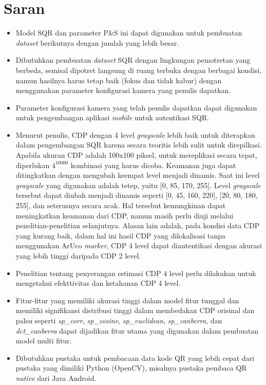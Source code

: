 \section{Saran}
\begin{itemize}
    \item Model SQR dan parameter P\&S ini dapat digunakan untuk pembuatan \emph{dataset} berikutnya dengan jumlah yang lebih besar.
    \item Dibutuhkan pembuatan \emph{dataset} SQR dengan lingkungan pemotretan yang berbeda, semisal dipotret langsung di ruang terbuka dengan berbagai kondisi, namun
          hasilnya harus tetap baik (fokus dan tidak kabur) dengan menggunakan parameter konfigurasi kamera yang penulis dapatkan.
    \item Parameter konfigurasi kamera yang telah penulis dapatkan dapat digunakan untuk pengembangan aplikasi \emph{mobile} untuk autentikasi SQR.
    \item Menurut penulis, CDP dengan 4 level \emph{grayscale} lebih baik untuk diterapkan dalam pengembangan SQR karena secara teoritis lebih sulit untuk direpilkasi.
          Apabila ukuran CDP adalah 100x100 piksel, untuk mereplikasi secara tepat, diperlukan $4^{10000}$ kombinasi yang harus dicoba. Keamanan juga dapat ditingkatkan
          dengan mengubah keempat level menjadi dinamis. Saat ini level \emph{grayscale} yang digunakan adalah tetep, yaitu [0, 85, 170, 255]. Level \emph{grayscale}
          tersebut dapat diubah menjadi dinamis seperti [0, 45, 160, 220], [20, 80, 180, 255], dan seterusnya secara acak. Hal tersebut kemungkinan dapat meningkatkan
          keamanan dari CDP, namun masih perlu diuji melalui penelitian-penelitian selanjutnya. Alasan lain adalah, pada kondisi data CDP yang kurang baik, dalam hal ini
          hasil CDP yang dilokalisasi tanpa menggunakan ArUco \emph{marker}, CDP 4 level dapat diautentikasi dengan akurasi yang lebih tinggi daripada CDP 2 level.
    \item Penelitian tentang penyerangan estimasi CDP 4 level perlu dilakukan untuk mengetahui efekttivitas dan ketahanan CDP 4 level.
    \item Fitur-fitur yang memiliki akurasi tinggi dalam model fitur tunggal dan memiliki signifikansi distribusi tinggi dalam membedakan CDP orisinal dan palsu seperti
          \emph{sp\_corr}, \emph{sp\_cosine}, \emph{sp\_euclidean}, \emph{sp\_canberra}, dan \emph{dct\_canberra} dapat dijadikan fitur utama yang digunakan dalam
          pembuatan model multi fitur.
    \item Dibutuhkan pustaka untuk pembacaan data kode QR yang lebih cepat dari pustaka yang dimiliki Python (OpenCV), misalnya pustaka pembaca QR \emph{native} dari
          Java Android.
\end{itemize}